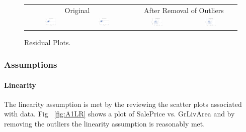 \documentclass[11pt]{scrartcl} %
\begin{document}
\begin{figure}[h] %
	\centering
	\begin{tabular}{p{} p{}p{}p{}}
	\hline
	\multicolumn{2}{|c|}{Original} &  \multicolumn{2}{|c|}{After Removal of Outliers} \\
		\multicolumn{1}{|c}{\includegraphics[width=0.23\textwidth]{../graphics/A1Residuals1}} &
		\multicolumn{1}{c|}{\includegraphics[width=0.23\textwidth]{../graphics/A1StudentResiduals1}} &
		\multicolumn{1}{|c}{\includegraphics[width=0.23\textwidth]{../graphics/A1Residuals2}} &
		\multicolumn{1}{c|}{\includegraphics[width=0.23\textwidth]{../graphics/A1StudentResiduals2}}\\
		\hline
	\end{tabular}		
	\caption{Residual Plots.}
	\label{fig:A1RP}
\end{figure}


\subsubsection{Assumptions}
\paragraph{Linearity} The linearity assumption is met by the reviewing the scatter plots associated with data. Fig ~\ref{fig:A1LR} shows a plot of SalePrice vs. GrLivArea and by removing the outliers the linearity assumption is reasonably met. 
\end{document}
